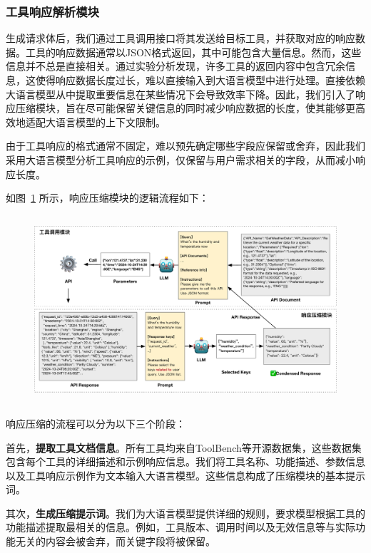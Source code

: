 \subsubsection{工具响应解析模块}

生成请求体后，我们通过工具调用接口将其发送给目标工具，并获取对应的响应数据。工具的响应数据通常以JSON格式返回，其中可能包含大量信息。然而，这些信息并不总是直接相关。通过实验分析发现，许多工具的返回内容中包含冗余信息，这使得响应数据长度过长，难以直接输入到大语言模型中进行处理。直接依赖大语言模型从中提取重要信息在某些情况下会导致效率下降。因此，我们引入了响应压缩模块，旨在尽可能保留关键信息的同时减少响应数据的长度，使其能够更高效地适配大语言模型的上下文限制。

由于工具响应的格式通常不固定，难以预先确定哪些字段应保留或舍弃，因此我们采用大语言模型分析工具响应的示例，仅保留与用户需求相关的字段，从而减小响应长度。

如图~\ref{fig:ch4-compression} 所示，响应压缩模块的逻辑流程如下：

\begin{figure}[!htp]
  \vspace{1em}
  \centering
  \setlength{\abovecaptionskip}{10pt} %
  \includegraphics[height=7cm]{../assets/ch4-工具调用模块.pdf}
  \label{fig:ch4-compression}
\end{figure}

响应压缩的流程可以分为以下三个阶段：

首先，\textbf{提取工具文档信息}。所有工具均来自ToolBench等开源数据集，这些数据集包含每个工具的详细描述和示例响应信息。我们将工具名称、功能描述、参数信息以及工具响应示例作为文本输入大语言模型。这些信息构成了压缩模块的基本提示词。

其次，\textbf{生成压缩提示词}。我们为大语言模型提供详细的规则，要求模型根据工具的功能描述提取最相关的信息。例如，工具版本、调用时间以及无效信息等与实际功能无关的内容会被舍弃，而关键字段将被保留。

